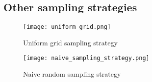 \documentclass[11pt]{article}
\begin{document}
\fi

\begin{appendices}


\section{Other sampling strategies}\label{section: Appendix-sample}
\begin{figure}[h!]
  \begin{center}
  \caption{Uniform grid sampling strategy} 
  \label{fig: uniform_grid}
  \texttt{[image: uniform\_grid.png]}
  \end{center}
  \end{figure}

  \begin{figure}[h!]
    \begin{center}
    \caption{Naive random sampling strategy} 
    \label{fig: random_sample}
    \texttt{[image: naive\_sampling\_strategy.png]}
    \end{center}
    \end{figure}





\end{appendices}
\end{document}
